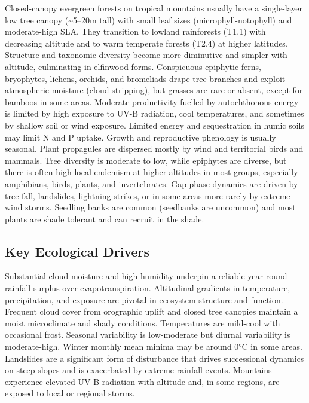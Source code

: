 \documentclass[
  letterpaper,
  DIV=11,
  numbers=noendperiod]{scrartcl}
\begin{document}
Closed-canopy evergreen forests on tropical mountains usually have a
single-layer low tree canopy (\textasciitilde5--20m tall) with small
leaf sizes (microphyll-notophyll) and moderate-high SLA. They transition
to lowland rainforests (T1.1) with decreasing altitude and to warm
temperate forests (T2.4) at higher latitudes. Structure and taxonomic
diversity become more diminutive and simpler with altitude, culminating
in elfinwood forms. Conspicuous epiphytic ferns, bryophytes, lichens,
orchids, and bromeliads drape tree branches and exploit atmospheric
moisture (cloud stripping), but grasses are rare or absent, except for
bamboos in some areas. Moderate productivity fuelled by autochthonous
energy is limited by high exposure to UV-B radiation, cool temperatures,
and sometimes by shallow soil or wind exposure. Limited energy and
sequestration in humic soils may limit N and P uptake. Growth and
reproductive phenology is usually seasonal. Plant propagules are
dispersed mostly by wind and territorial birds and mammals. Tree
diversity is moderate to low, while epiphytes are diverse, but there is
often high local endemism at higher altitudes in most groups, especially
amphibians, birds, plants, and invertebrates. Gap-phase dynamics are
driven by tree-fall, landslides, lightning strikes, or in some areas
more rarely by extreme wind storms. Seedling banks are common (seedbanks
are uncommon) and most plants are shade tolerant and can recruit in the
shade.

\subsection{Key Ecological Drivers}\label{key-ecological-drivers-71}

Substantial cloud moisture and high humidity underpin a reliable
year-round rainfall surplus over evapotranspiration. Altitudinal
gradients in temperature, precipitation, and exposure are pivotal in
ecosystem structure and function. Frequent cloud cover from orographic
uplift and closed tree canopies maintain a moist microclimate and shady
conditions. Temperatures are mild-cool with occasional frost. Seasonal
variability is low-moderate but diurnal variability is moderate-high.
Winter monthly mean minima may be around 0°C in some areas. Landslides
are a significant form of disturbance that drives successional dynamics
on steep slopes and is exacerbated by extreme rainfall events. Mountains
experience elevated UV-B radiation with altitude and, in some regions,
are exposed to local or regional storms.
\end{document}
